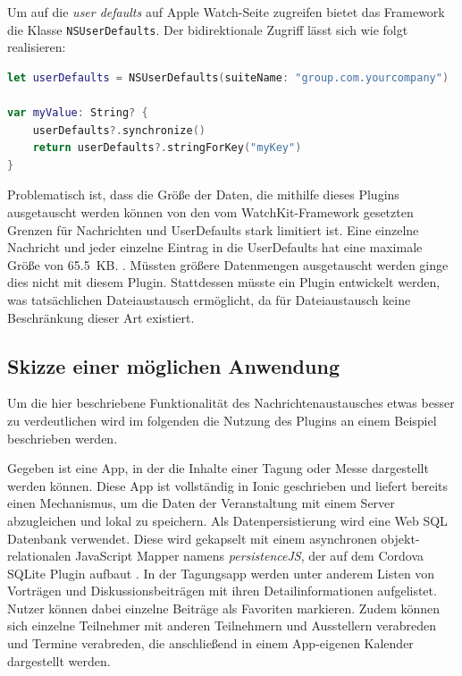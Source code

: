 Um auf die \emph{user defaults} auf Apple Watch-Seite zugreifen bietet das Framework die Klasse \texttt{NSUserDefaults}. Der bidirektionale Zugriff lässt sich wie folgt realisieren:
\begin{lstlisting}[language=swift, breaklines=true]
let userDefaults = NSUserDefaults(suiteName: "group.com.yourcompany")

var myValue: String? {
    userDefaults?.synchronize()
    return userDefaults?.stringForKey("myKey")
}
\end{lstlisting}
%
Problematisch ist, dass die Größe der Daten, die mithilfe dieses Plugins ausgetauscht werden können von den vom WatchKit-Framework gesetzten Grenzen für Nachrichten und UserDefaults stark limitiert ist. Eine einzelne Nachricht und jeder einzelne Eintrag in die UserDefaults hat eine maximale Größe von 65.5~KB. \cite{appleWatchPayloadMaximumDatatransfer}. Müssten größere Datenmengen ausgetauscht werden ginge dies nicht mit diesem Plugin. Stattdessen müsste ein Plugin entwickelt werden, was tatsächlichen Dateiaustausch ermöglicht, da für Dateiaustausch keine Beschränkung dieser Art existiert.
%
%
\subsection{Skizze einer möglichen Anwendung}
%
Um die hier beschriebene Funktionalität des Nachrichtenaustausches etwas besser zu verdeutlichen wird im folgenden die Nutzung des Plugins an einem Beispiel beschrieben werden.

Gegeben ist eine App, in der die Inhalte einer Tagung oder Messe dargestellt werden können. Diese App ist vollständig in Ionic geschrieben und liefert bereits einen Mechanismus, um die Daten der Veranstaltung mit einem Server abzugleichen und lokal zu speichern. Als Datenpersistierung wird eine Web SQL Datenbank verwendet. Diese wird gekapselt mit einem asynchronen objekt-relationalen JavaScript Mapper namens \emph{persistenceJS}, der auf dem Cordova SQLite Plugin aufbaut \cite{persistenceJSDoku}. In der Tagungsapp werden unter anderem Listen von Vorträgen und Diskussionsbeiträgen mit ihren Detailinformationen aufgelistet. Nutzer können dabei einzelne Beiträge als Favoriten markieren. Zudem können sich einzelne Teilnehmer mit anderen Teilnehmern und Ausstellern verabreden und Termine verabreden, die anschließend in einem App-eigenen Kalender dargestellt werden.

